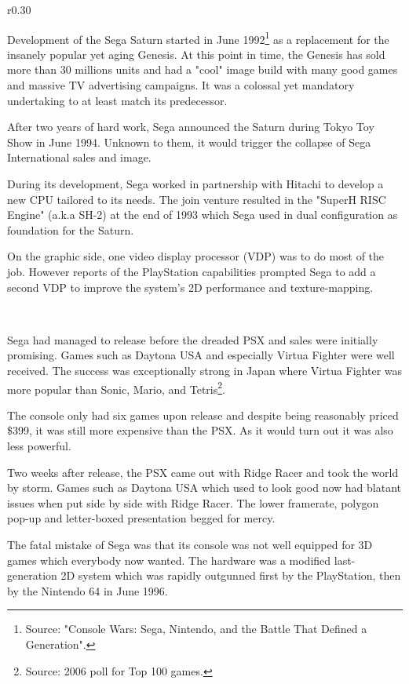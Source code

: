 \begin{wrapfigure}[10]{r}{0.30\textwidth}{
\centering {}}
\end{wrapfigure}
Development of the Sega Saturn started in June 1992\footnote{Source: "Console Wars: Sega, Nintendo, and the Battle That Defined a Generation".} as a replacement for the insanely popular yet aging Genesis. At this point in time, the Genesis has sold more than 30 millions units and had a "cool" image build with many good games and massive TV advertising campaigns. It was a colossal yet mandatory undertaking to at least match its predecessor.\\
\par
After two years of hard work, Sega announced the Saturn during Tokyo Toy Show in June 1994. Unknown to them, it would trigger the collapse of Sega International sales and image.\\
\par
During its development, Sega worked in partnership with Hitachi to develop a new CPU tailored to its needs. The join venture resulted in the "SuperH RISC Engine" (a.k.a SH-2) at the end of 1993 which Sega used in dual configuration as foundation for the Saturn.\\
\par
 On the graphic side, one video display processor (VDP) was to do most of the job. However reports of the PlayStation capabilities prompted Sega to add a second VDP to improve the system's 2D performance and texture-mapping.\\
\par
{}\\


\par
Sega had managed to release before the dreaded PSX and sales were initially promising. Games such as Daytona USA and especially Virtua Fighter were well received. The success was exceptionally strong in Japan where Virtua Fighter was more popular than Sonic, Mario, and Tetris\footnote{Source: 2006 poll for Top 100 games.}.\\
\par
The console only had six games upon release and despite being reasonably priced \$399, it was still more expensive than the PSX. As it would turn out it was also less powerful.\\
\par
 Two weeks after release, the PSX came out with Ridge Racer and took the world by storm. Games such as Daytona USA which used to look good now had blatant issues when put side by side with Ridge Racer. The lower framerate, polygon pop-up and letter-boxed presentation begged for mercy.\\
\par
The fatal mistake of Sega was that its console was not well equipped for 3D games which everybody now wanted. The hardware was a modified last-generation 2D system which was rapidly outgunned first by the PlayStation, then by the Nintendo 64 in June 1996.








